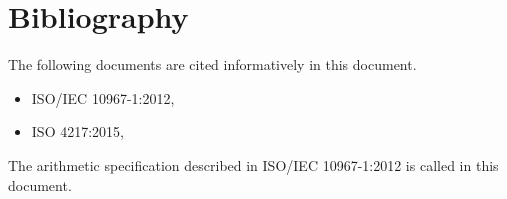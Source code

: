 
\chapter{Bibliography}

The following documents are cited informatively in this document.

\begin{itemize}
\renewcommand{\labelitemi}{---}
\item
  ISO/IEC 10967-1:2012,
\item
  ISO 4217:2015,
\end{itemize}

The arithmetic specification described in ISO/IEC 10967-1:2012 is
called  in this document.

\let\realglossitem\glossitem
\renewcommand{\glossitem}[4]{\hangpara{4em}{1}\realglossitem{#1}{#2}{#3}{#4}}

\clearpage
\renewcommand{\glossaryname}{Cross references}
\renewcommand{\preglossaryhook}{This annex lists each clause or subclause label and the
corresponding clause or subclause number and page number, in alphabetical order by label.\\}
\twocolglossary
\renewcommand{\leftmark}{\glossaryname}
{
\raggedright
\printglossary[xrefindex]
}

\clearpage

\renewcommand{\glossaryname}{Cross references from ISO \CppXVII}
\renewcommand{\preglossaryhook}{All clause and subclause labels from
ISO \CppXVII (ISO/IEC 14882:2017, \doccite{Programming Languages --- \Cpp})
are present in this document, with the exceptions described below.\\}
\renewcommand{\leftmark}{\glossaryname}
{
\raggedright
\printglossary[xrefdelta]
}

\clearpage
\renewcommand{\leftmark}{\indexname}
{
\raggedright
\printindex[generalindex]
}

\clearpage
\renewcommand{\indexname}{Index of grammar productions}
\renewcommand{\preindexhook}{The first page number for each entry is the page in the
general text where the grammar production is defined. The second page number is the
corresponding page in the Grammar summary\iref{gram}.\\}
\renewcommand{\leftmark}{\indexname}
{
\raggedright
\printindex[grammarindex]
}

\clearpage
\renewcommand{\preindexhook}{}
\renewcommand{\indexname}{Index of library names}
\renewcommand{\leftmark}{\indexname}
{
\raggedright
\printindex[libraryindex]
}

\clearpage
\renewcommand{\preindexhook}{The entries in this index are rough descriptions; exact
specifications are at the indicated page in the general text.\\}
\renewcommand{\indexname}{Index of implementation-defined behavior}
\renewcommand{\leftmark}{\indexname}
{
\raggedright
\printindex[impldefindex]
}
